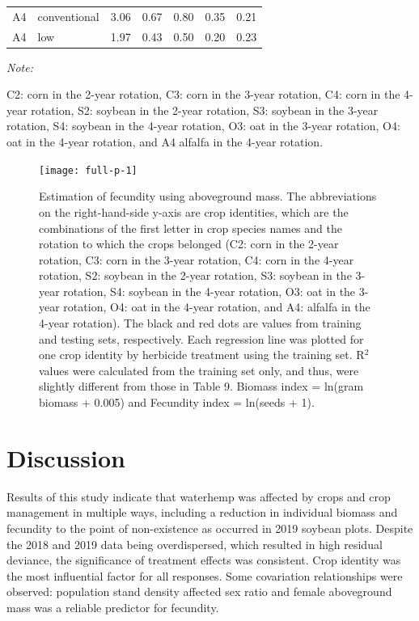 \documentclass[
]{article}
\begin{document}
\begin{table}
\begin{threeparttable}
\begin{tabular}[t]{llrrrrr}
A4 & conventional & 3.06 & 0.67 & 0.80 & 0.35 & 0.21\\
A4 & low & 1.97 & 0.43 & 0.50 & 0.20 & 0.23\\
\bottomrule
\end{tabular}
\begin{tablenotes}[para]
\item \textit{Note: } 
\item C2: corn in the 2-year rotation, C3: corn in the 3-year rotation, C4: corn in the 4-year rotation, S2: soybean in the 2-year rotation, S3: soybean in the 3-year rotation, S4: soybean in the 4-year rotation, O3: oat in the 3-year rotation, O4: oat in the 4-year rotation, and A4 alfalfa in the 4-year rotation.
\end{tablenotes}
\end{threeparttable}
\end{table}

\begin{figure}[H]
\texttt{[image: full-p-1]} \caption{Estimation of fecundity using aboveground mass. The abbreviations on the right-hand-side y-axis are crop identities, which are the combinations of the first letter in crop species names and the rotation to which the crops belonged (C2: corn in the 2-year rotation, C3: corn in the 3-year rotation, C4: corn in the 4-year rotation, S2: soybean in the 2-year rotation, S3: soybean in the 3-year rotation, S4: soybean in the 4-year rotation, O3: oat in the 3-year rotation, O4: oat in the 4-year rotation, and A4: alfalfa in the 4-year rotation). The black and red dots are values from training and testing sets, respectively. Each regression line was plotted for one crop identity by herbicide treatment using the training set. R$^2$ values were calculated from the training set only, and thus, were slightly different from those in Table 9. Biomass index = ln(gram biomass + 0.005) and Fecundity index = ln(seeds + 1).} \label{fig:full-p}
\end{figure}

\hypertarget{discussion}{%
\section*{Discussion}\label{discussion}}

Results of this study indicate that waterhemp was affected by crops and crop management in multiple ways, including a reduction in individual biomass and fecundity to the point of non-existence as occurred in 2019 soybean plots.
Despite the 2018 and 2019 data being overdispersed, which resulted in high residual deviance, the significance of treatment effects was consistent. Crop identity was the most influential factor for all responses. Some covariation relationships were observed: population stand density affected sex ratio and female aboveground mass was a reliable predictor for fecundity.
\end{document}
